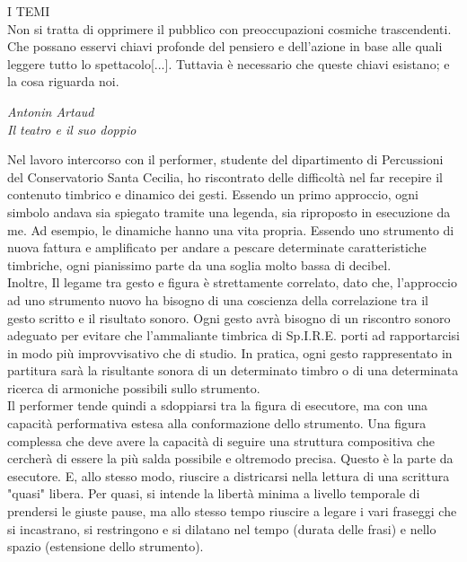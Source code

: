 \epigraph{I TEMI \\ Non si tratta di opprimere il pubblico con preoccupazioni cosmiche trascendenti. Che possano esservi chiavi profonde del pensiero e dell'azione in base alle quali leggere tutto lo spettacolo[...]. Tuttavia è necessario che queste chiavi esistano; e la cosa riguarda noi.}{\textit{Antonin Artaud \\ Il teatro e il suo doppio}}

Nel lavoro intercorso con il performer, studente del dipartimento di Percussioni del Conservatorio Santa Cecilia, ho riscontrato delle difficoltà nel far recepire il contenuto timbrico e dinamico dei gesti. Essendo un primo approccio, ogni simbolo andava sia spiegato tramite una legenda, sia riproposto in esecuzione da me. Ad esempio, le dinamiche hanno una vita propria. Essendo uno strumento di nuova fattura e amplificato per andare a pescare determinate caratteristiche timbriche, ogni pianissimo parte da una soglia molto bassa di decibel. \\
Inoltre, Il legame tra gesto e figura è strettamente correlato, dato che, l'approccio ad uno strumento nuovo ha bisogno di una coscienza della correlazione tra il gesto scritto e il risultato sonoro. Ogni gesto avrà bisogno di un riscontro sonoro adeguato per evitare che l'ammaliante timbrica di Sp.I.R.E. porti ad rapportarcisi in modo più improvvisativo che di studio. In pratica, ogni gesto rappresentato in partitura sarà la risultante sonora di un determinato timbro o di una determinata ricerca di armoniche possibili sullo strumento. \\
Il performer tende quindi a sdoppiarsi tra la figura di esecutore, ma con una capacità performativa estesa alla conformazione dello strumento. Una figura complessa che deve avere la capacità di seguire una struttura compositiva che cercherà di essere la più salda possibile e oltremodo precisa. Questo è la parte da esecutore. E, allo stesso modo, riuscire a districarsi nella lettura di una scrittura "quasi" libera. Per quasi, si intende la libertà minima a livello temporale di prendersi le giuste pause, ma allo stesso tempo riuscire a legare i vari fraseggi che si incastrano, si restringono e si dilatano nel tempo (durata delle frasi) e nello spazio (estensione dello strumento).
